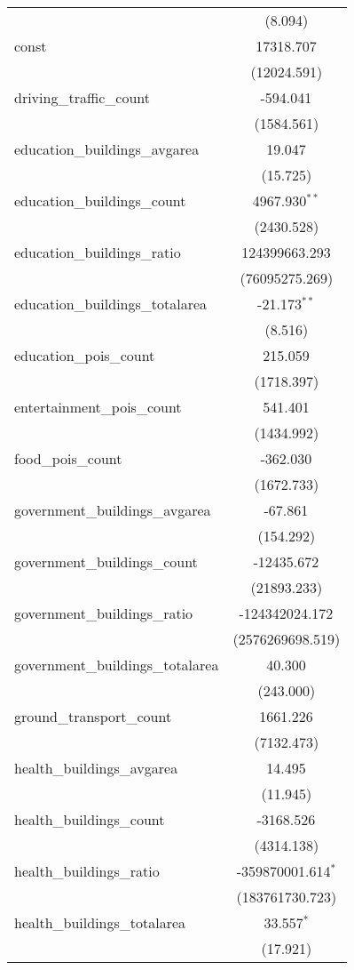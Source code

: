 \begin{table}[!htbp]
\begin{tabular}{@{\extracolsep{5pt}}lc}
  & (8.094) \\
 const & 17318.707$^{}$ \\
  & (12024.591) \\
 driving_traffic_count & -594.041$^{}$ \\
  & (1584.561) \\
 education_buildings_avgarea & 19.047$^{}$ \\
  & (15.725) \\
 education_buildings_count & 4967.930$^{**}$ \\
  & (2430.528) \\
 education_buildings_ratio & 124399663.293$^{}$ \\
  & (76095275.269) \\
 education_buildings_totalarea & -21.173$^{**}$ \\
  & (8.516) \\
 education_pois_count & 215.059$^{}$ \\
  & (1718.397) \\
 entertainment_pois_count & 541.401$^{}$ \\
  & (1434.992) \\
 food_pois_count & -362.030$^{}$ \\
  & (1672.733) \\
 government_buildings_avgarea & -67.861$^{}$ \\
  & (154.292) \\
 government_buildings_count & -12435.672$^{}$ \\
  & (21893.233) \\
 government_buildings_ratio & -124342024.172$^{}$ \\
  & (2576269698.519) \\
 government_buildings_totalarea & 40.300$^{}$ \\
  & (243.000) \\
 ground_transport_count & 1661.226$^{}$ \\
  & (7132.473) \\
 health_buildings_avgarea & 14.495$^{}$ \\
  & (11.945) \\
 health_buildings_count & -3168.526$^{}$ \\
  & (4314.138) \\
 health_buildings_ratio & -359870001.614$^{*}$ \\
  & (183761730.723) \\
 health_buildings_totalarea & 33.557$^{*}$ \\
  & (17.921) \\

\end{tabular}
\end{table}
